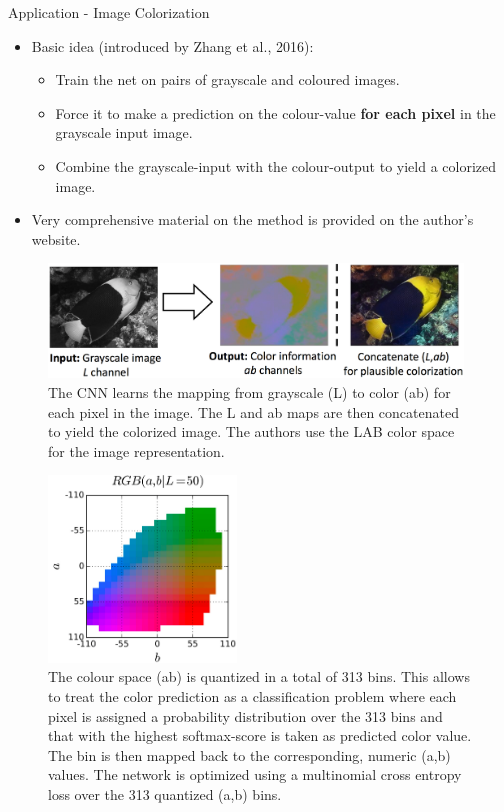 \begin{vbframe}{Application - Image Colorization}
    \begin{itemize}
        \item Basic idea (introduced by Zhang et al., 2016):
        \begin{itemize}
            \item Train the net on pairs of grayscale and coloured images.
            \item Force it to make a prediction on the colour-value \textbf{for each pixel} in the grayscale input image.
            \item Combine the grayscale-input with the colour-output to yield a colorized image.
        \end{itemize}
        \item Very comprehensive material on the method is provided on the author's website. \href{http://richzhang.github.io/colorization/}{}
            \end{itemize}
            \framebreak
            \begin{figure}
            \centering
            \includegraphics[width=11cm]{plots/application/fish_lab.png}
            \caption{The CNN learns the mapping from grayscale (L) to color (ab) for each pixel in the image. The L and ab maps are then concatenated to yield the colorized image. The authors use the LAB color space for the image representation.}
            \end{figure}
            \framebreak
            \begin{figure}
            \centering
            \includegraphics[width=5cm]{plots/application/lab.png}
            \caption{The colour space (ab) is quantized in a total of 313 bins. This allows to treat the color prediction as a classification problem where each pixel is assigned a probability distribution over the 313 bins and that with the highest softmax-score is taken as predicted color value. The bin is then mapped back to the corresponding, numeric (a,b) values. The network is optimized using a multinomial cross entropy loss over the 313 quantized (a,b) bins.}

\end{figure}
\end{vbframe}
